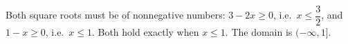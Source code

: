 Both square roots must be of nonnegative numbers: $3-2x\ge0$, i.e.\ $x\le\dfrac{3}{2}$, and $1-x\ge0$, i.e.\ $x\le1$. Both hold exactly when $x\le1$. The domain is $\boxed{(-\infty,1]}$.
